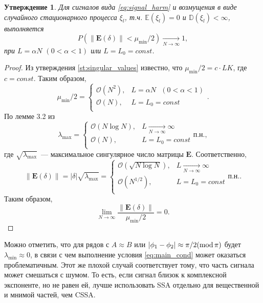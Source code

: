 \documentclass[specialist,
               substylefile = spbu.rtx,
               subf,href,colorlinks=true, 12pt]{disser}
\newtheorem{statement}{Утверждение}
\begin{document}
\begin{statement} \label{st:cond_compl_noise}
	Для сигналов вида \eqref{eq:signal_harm} и возмущения в виде случайного стационарного процесса $\xi_l$, т.ч. $\mathbb{E}(\xi_l) = 0$ и $\mathbb{D}(\xi_l) < \infty$, выполняется
	$$P(\|\mathbf{E}(\delta)\| < \mu_{\min} / 2) \xrightarrow[N \rightarrow \infty]{} 1,$$
	при $L = \alpha N$ $(0 < \alpha < 1)$ или $L = L_0 = const$.
\end{statement}
\begin{proof}
	Из утверждения \ref{st:singular_values} известно, что $\mu_{\min} / 2 = c\cdot LK$, где $c = const$. Таким образом,
	$$\mu_{\min} / 2 =
	\begin{cases}
		\mathcal{O}(N^{2}), & \text{$L = \alpha N$ $(0 < \alpha < 1)$}\\
		\mathcal{O}(N), & \text{$L = L_0 = const$}\\
	\end{cases}.
	$$
	По лемме 3.2 из \cite{Nekrutkin}
	$$\lambda_{\max} =
	\begin{cases}
		\mathcal{O}(N \log N), & \text{$L \xrightarrow[N \rightarrow \infty]{} \infty$}\\
		\mathcal{O}(N), & \text{$L = L_0 = const$}\\
	\end{cases} \text{п.н.},
	$$
	где $\sqrt{\lambda_{\max}}$~--- максимальное сингулярное число матрицы $\mathbf{E}$.
	Соответственно,
	$$\|\mathbf{E}(\delta)\| = |\delta|\sqrt{\lambda_{\max}} =
	\begin{cases}
		\mathcal{O}(\sqrt{N \log N}), & \text{$L \xrightarrow[N \rightarrow \infty]{} \infty$}\\
		\mathcal{O}(N^{1/2}), & \text{$L = L_0 = const$}\\
	\end{cases} \text{п.н.}.
	$$
	Таким образом,
	$$\lim_{N \rightarrow \infty} \frac{\|\mathbf{E}(\delta)\|}{\mu_{\min} / 2} = 0.$$
\end{proof}

Можно отметить, что для рядов с $A \approx B$ или $|\phi_1 - \phi_2| \approx \pi / 2(\mathop{\mathrm{mod}} \pi)$ будет $\lambda_{\min} \approx 0$, в связи с чем выполнение условия \eqref{eq:main_cond} может оказаться проблематичным.
Этот же плохой случай соответствует тому, что часть сигнала может смешаться с шумом.
То есть, если сигнал близок к комплексной экспоненте, но не равен ей, лучше использовать SSA отдельно для вещественной и мнимой частей, чем CSSA.


\end{document}
